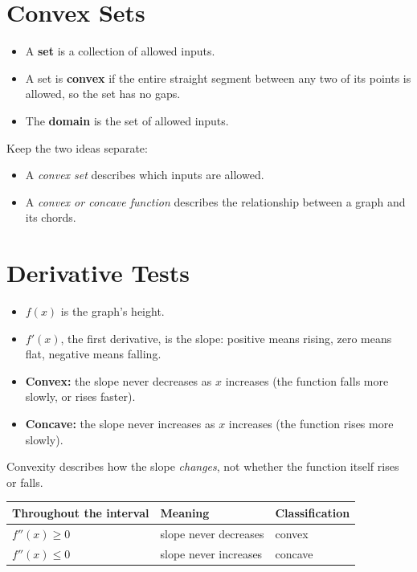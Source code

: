 \documentclass[11pt]{article}
\begin{document}
\section{Convex Sets}

\begin{itemize}
    \item A \textbf{set} is a collection of allowed inputs.
    \item A set is \textbf{convex} if the entire straight segment between any two
          of its points is allowed, so the set has no gaps.
    \item The \textbf{domain} is the set of allowed inputs.
\end{itemize}

Keep the two ideas separate:
\begin{itemize}
    \item A \emph{convex set} describes which inputs are allowed.
    \item A \emph{convex or concave function} describes the relationship between
          a graph and its chords.
\end{itemize}

\section{Derivative Tests}

\begin{itemize}
    \item $f(x)$ is the graph's height.
    \item $f'(x)$, the first derivative, is the slope: positive means rising, zero
          means flat, negative means falling.
\end{itemize}

\begin{itemize}
    \item \textbf{Convex:} the slope never decreases as $x$ increases (the function
          falls more slowly, or rises faster).
    \item \textbf{Concave:} the slope never increases as $x$ increases (the
          function rises more slowly).
\end{itemize}

Convexity describes how the slope \emph{changes}, not whether the function itself
rises or falls.

\begin{center}
\begin{tabular}{lll}
    \toprule
    Throughout the interval & Meaning & Classification \\
    \midrule
    $f''(x) \ge 0$ & slope never decreases & convex \\
    $f''(x) \le 0$ & slope never increases & concave \\
    \bottomrule
\end{tabular}
\end{center}
\end{document}
